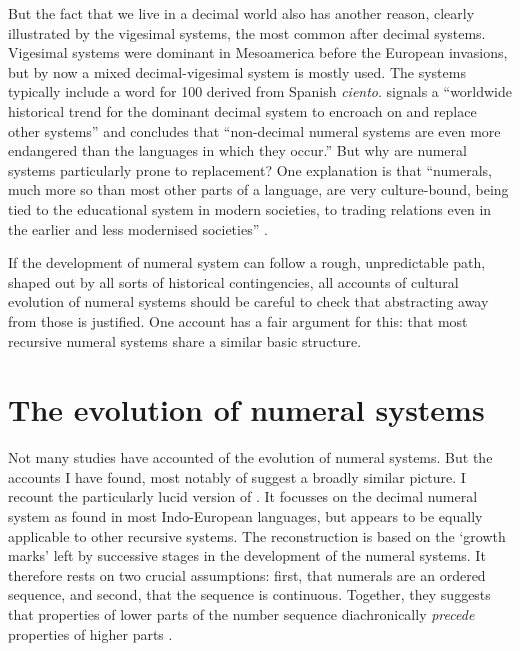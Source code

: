 \documentclass{../src/bcthesispart}
\begin{document}
But the fact that we live in a decimal world also has another reason, clearly illustrated by the vigesimal systems, the most common after decimal systems.
Vigesimal systems were dominant in Mesoamerica before the European invasions, but by now a mixed decimal-vigesimal system is mostly used.
The systems typically include a word for 100 derived from Spanish \emph{ciento}. 
\textcite{Comrie2013} signals a “worldwide historical trend for the dominant decimal system to encroach on and replace other systems” and concludes that “non-decimal numeral systems are even more endangered than the languages in which they occur.”
But why are numeral systems particularly prone to replacement?
One explanation is that “numerals, much more so than most other parts of a language, are very culture-bound, being tied to the educational system in modern societies, to trading relations even in the earlier and less modernised societies” \parencite{Comrie1999}.





If the development of numeral system can follow a rough, unpredictable path, shaped out by all sorts of historical contingencies, all accounts of cultural evolution of numeral systems should be careful to check that abstracting away from those is justified.
One account has a fair argument for this: that most recursive numeral systems share a similar basic structure.





\section{The evolution of numeral systems}

Not many studies have accounted of the evolution of numeral systems.
But the accounts I have found, most notably of \textcite{VonMengden2008,Hurford1987,Hurford2007,Comrie1999} suggest a broadly similar picture.
I recount the particularly lucid version of \textcite{VonMengden2008}.
It focusses on the decimal numeral system as found in most Indo-European languages, but appears to be equally applicable to other recursive systems.
The reconstruction is based on the ‘growth marks’ \parencite{Hurford1987} left by successive stages in the development of the numeral systems.
It therefore rests on two crucial assumptions: first, that numerals are an ordered sequence, and second, that the sequence is continuous.
Together, they suggests that properties of lower parts of the number sequence diachronically \emph{precede} properties of higher parts \parencite{VonMengden2008}.
\end{document}
